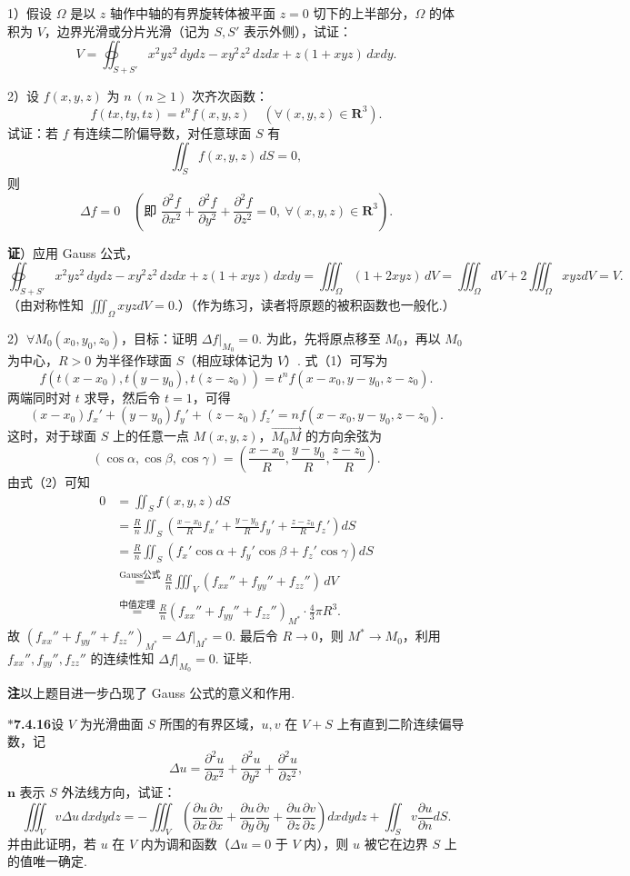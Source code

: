 \documentclass[UTF8,12pt,a4paper,fontset=fandol]{ctexart}
\providecommand{\xlongequal}[1]{\overset{#1}{=}}
\begin{document}
1）假设 $\Omega$ 是以 $z$ 轴作中轴的有界旋转体被平面 $z=0$ 切下的上半部分，$\Omega$ 的体积为 $V$，边界光滑或分片光滑（记为 $S,S'$ 表示外侧），试证：
\[
V=\oiint_{S+S'}x^2yz^2\,dydz-xy^2z^2\,dzdx+z(1+xyz)\,dxdy.
\]

2）设 $f(x,y,z)$ 为 $n\ (n\ge1)$ 次齐次函数：
\[
f(tx,ty,tz)=t^nf(x,y,z)\quad(\forall(x,y,z)\in\mathbf R^3). \tag{1}
\]
试证：若 $f$ 有连续二阶偏导数，对任意球面 $S$ 有
\[
\iint_Sf(x,y,z)\,dS=0, \tag{2}
\]
则
\[
\Delta f=0\quad\left(\text{即 }\frac{\partial^2f}{\partial x^2}+\frac{\partial^2f}{\partial y^2}+\frac{\partial^2f}{\partial z^2}=0,\ \forall(x,y,z)\in\mathbf R^3\right). \tag{3}
\]

\noindent\textbf{证}）应用 Gauss 公式，
\[
\oiint_{S+S'}x^2yz^2\,dydz-xy^2z^2\,dzdx+z(1+xyz)\,dxdy
=\iiint_\Omega(1+2xyz)\,dV=\iiint_\Omega dV+2\iiint_\Omega xyzdV=V.
\]
（由对称性知 $\iiint_\Omega xyzdV=0$.）（作为练习，读者将原题的被积函数也一般化.）

2）$\forall M_0(x_0,y_0,z_0)$，目标：证明 $\Delta f|_{M_0}=0$. 为此，先将原点移至 $M_0$，再以 $M_0$ 为中心，$R>0$ 为半径作球面 $S$（相应球体记为 $V$）. 式（1）可写为
\[
f(t(x-x_0),t(y-y_0),t(z-z_0))=t^nf(x-x_0,y-y_0,z-z_0).
\]
两端同时对 $t$ 求导，然后令 $t=1$，可得
\[
(x-x_0)f_x'+(y-y_0)f_y'+(z-z_0)f_z'=nf(x-x_0,y-y_0,z-z_0).
\]
这时，对于球面 $S$ 上的任意一点 $M(x,y,z)$，$\overrightarrow{M_0M}$ 的方向余弦为
\[
(\cos\alpha,\cos\beta,\cos\gamma)=\left(\frac{x-x_0}{R},\frac{y-y_0}{R},\frac{z-z_0}{R}\right).
\]
由式（2）可知
\[
\begin{aligned}
0&=\iint_Sf(x,y,z)dS\\
&=\frac Rn\iint_S\left(\frac{x-x_0}{R}f_x'+\frac{y-y_0}{R}f_y'+\frac{z-z_0}{R}f_z'\right)dS\\
&=\frac Rn\iint_S(f_x'\cos\alpha+f_y'\cos\beta+f_z'\cos\gamma)dS\\
&\xlongequal{\text{Gauss公式}}\frac Rn\iiint_V(f_{xx}''+f_{yy}''+f_{zz}'')\,dV\\
&\xlongequal{\text{中值定理}}\frac Rn(f_{xx}''+f_{yy}''+f_{zz}'')_{M^*}\cdot\frac43\pi R^3.
\end{aligned}
\]
故 $(f_{xx}''+f_{yy}''+f_{zz}'')_{M^*}=\Delta f|_{M^*}=0$. 最后令 $R\to0$，则 $M^*\to M_0$，利用 $f_{xx}'',f_{yy}'',f_{zz}''$ 的连续性知 $\Delta f|_{M_0}=0$. 证毕.

\noindent\textbf{注}\quad 以上题目进一步凸现了 Gauss 公式的意义和作用.

\noindent\textbf{$*$7.4.16}\quad 设 $V$ 为光滑曲面 $S$ 所围的有界区域，$u,v$ 在 $V+S$ 上有直到二阶连续偏导数，记
\[
\Delta u=\frac{\partial^2u}{\partial x^2}+\frac{\partial^2u}{\partial y^2}+\frac{\partial^2u}{\partial z^2},
\]
$\mathbf n$ 表示 $S$ 外法线方向，试证：
\[
\iiint_V v\Delta u\,dxdydz
=-\iiint_V\left(\frac{\partial u}{\partial x}\frac{\partial v}{\partial x}
+\frac{\partial u}{\partial y}\frac{\partial v}{\partial y}
+\frac{\partial u}{\partial z}\frac{\partial v}{\partial z}\right)dxdydz
+\iint_Sv\frac{\partial u}{\partial n}dS.
\]
并由此证明，若 $u$ 在 $V$ 内为调和函数（$\Delta u=0$ 于 $V$ 内），则 $u$ 被它在边界 $S$ 上的值唯一确定.
\end{document}
